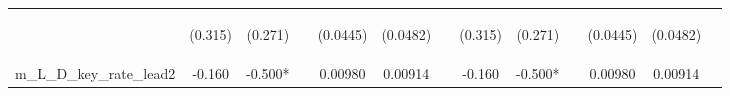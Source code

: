 \documentclass[]{article}
\begin{document}
\begin{center}
\begin{tabular}{lcccccccccccc}
\vspace{4pt} & \begin{footnotesize}(0.315)\end{footnotesize} & \begin{footnotesize}(0.271)\end{footnotesize} & \begin{footnotesize}\end{footnotesize} & \begin{footnotesize}(0.0445)\end{footnotesize} & \begin{footnotesize}(0.0482)\end{footnotesize} & \begin{footnotesize}\end{footnotesize} & \begin{footnotesize}(0.315)\end{footnotesize} & \begin{footnotesize}(0.271)\end{footnotesize} & \begin{footnotesize}\end{footnotesize} & \begin{footnotesize}(0.0445)\end{footnotesize} & \begin{footnotesize}(0.0482)\end{footnotesize} & \begin{footnotesize}\end{footnotesize} \\
m\_L\_D\_key\_rate\_lead2 & -0.160 & -0.500* &  & 0.00980 & 0.00914 &  & -0.160 & -0.500* &  & 0.00980 & 0.00914 &  \\

\end{tabular}
\end{center}
\end{document}
